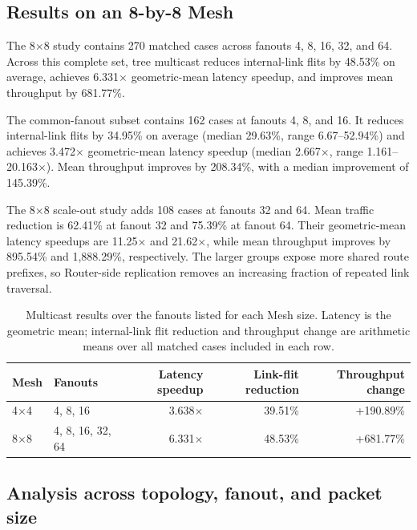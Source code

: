 \documentclass[10pt]{article}
\begin{document}
\subsection{Results on an 8-by-8 Mesh}

The 8$\times$8 study contains 270 matched cases across fanouts 4, 8, 16, 32,
and 64.  Across this complete set, tree multicast reduces internal-link flits
by 48.53\% on average, achieves 6.331$\times$ geometric-mean latency speedup,
and improves mean throughput by 681.77\%.

The common-fanout subset contains 162 cases at fanouts 4, 8, and 16.  It
reduces internal-link flits by 34.95\% on average (median 29.63\%, range
6.67--52.94\%) and achieves 3.472$\times$ geometric-mean latency speedup
(median 2.667$\times$, range 1.161--20.163$\times$).  Mean throughput improves
by 208.34\%, with a median improvement of 145.39\%.

The 8$\times$8 scale-out study adds 108 cases at fanouts 32 and 64.  Mean
traffic reduction is 62.41\% at fanout 32 and 75.39\% at fanout 64.  Their
geometric-mean latency speedups are 11.25$\times$ and 21.62$\times$, while
mean throughput improves by 895.54\% and 1,888.29\%, respectively.  The larger
groups expose more shared route prefixes, so Router-side replication removes
an increasing fraction of repeated link traversal.

\begin{table}[tb]
\centering
\caption{Multicast results over the fanouts listed for each Mesh size.  Latency
is the geometric mean; internal-link flit reduction and throughput change are
arithmetic means over all matched cases included in each row.}
\label{tab:multicast-topology-results}
\small
\begin{tabular}{@{}llrrr@{}}
\toprule
Mesh & Fanouts & Latency speedup & Link-flit reduction & Throughput change \\
\midrule
4$\times$4 & 4, 8, 16 & 3.638$\times$ & 39.51\% & +190.89\% \\
8$\times$8 & 4, 8, 16, 32, 64 & 6.331$\times$ & 48.53\% & +681.77\% \\
\bottomrule
\end{tabular}
\end{table}

\subsection{Analysis across topology, fanout, and packet size}
\end{document}
